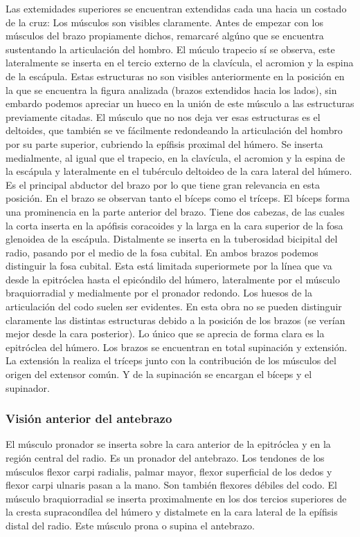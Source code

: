 Las extemidades superiores se encuentran extendidas cada una hacia un costado de la cruz: Los músculos son visibles claramente. Antes de empezar con los músculos del brazo propiamente dichos, remarcaré algúno que se encuentra sustentando la articulación del hombro. El múculo trapecio sí se observa, este lateralmente se inserta en el tercio externo de la clavícula, el acromion y la espina de la escápula. Estas estructuras no son visibles anteriormente en la posición en la que se encuentra la figura analizada (brazos extendidos hacia los lados), sin embardo podemos apreciar un hueco en la unión de este músculo a las estructuras previamente citadas. El músculo que no nos deja ver esas estructuras es el deltoides, que también se ve fácilmente redondeando la articulación del hombro por su parte superior, cubriendo la epífisis proximal del húmero. Se inserta medialmente, al igual que el trapecio, en la clavícula, el acromion y la espina de la escápula y lateralmente en el tubérculo deltoideo de la cara lateral del húmero. Es el principal abductor del brazo por lo que tiene gran relevancia en esta posición.
En el brazo se observan tanto el bíceps como el tríceps. El bíceps forma una prominencia en la parte anterior del brazo. Tiene dos cabezas, de las cuales la corta inserta en la apófisis coracoides y la larga en la cara superior de la fosa glenoidea de la escápula. Distalmente se inserta en la tuberosidad bicipital del radio, pasando por el medio de la fosa cubital.
En ambos brazos podemos distinguir la fosa cubital. Esta está limitada superiormete por la línea que va desde la epitróclea hasta el epicóndilo del húmero, lateralmente por el músculo braquiorradial y medialmente por el pronador redondo.
Los huesos de la articulación del codo suelen ser evidentes. En esta obra no se pueden distinguir claramente las distintas estructuras debido a la posición de los brazos (se verían mejor desde la cara posterior). Lo único que se aprecia de forma clara es la epitróclea del húmero.
Los brazos se encuentran en total supinación y extensión. La extensión la realiza el tríceps junto con la contribución de los músculos del origen del extensor común. Y de la supinación se encargan el bíceps y el supinador.
\subsubsection{Visión anterior del antebrazo}
El músculo pronador se inserta sobre la cara anterior de la epitróclea y en la región central del radio. Es un pronador del antebrazo. Los tendones de los músculos flexor carpi radialis, palmar mayor, flexor superficial de los dedos y flexor carpi ulnaris pasan a la mano. Son también flexores débiles del codo.
El músculo braquiorradial se inserta proximalmente  en los dos tercios superiores de la cresta supracondílea del húmero y distalmete en la cara lateral de la epífisis distal del radio. Este músculo prona o supina el antebrazo.


